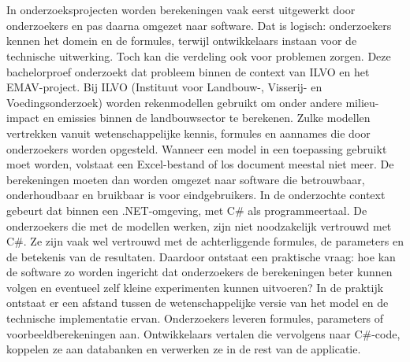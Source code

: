 
\chapter{}%
\label{ch:inleiding}

In onderzoeksprojecten worden berekeningen vaak eerst uitgewerkt door onderzoekers en pas daarna omgezet naar software. Dat is logisch: onderzoekers kennen het domein en de formules, terwijl ontwikkelaars instaan voor de technische uitwerking. Toch kan die verdeling ook voor problemen zorgen. Deze bachelorproef onderzoekt dat probleem binnen de context van ILVO en het EMAV-project.                                                                                   
Bij ILVO (Instituut voor Landbouw-, Visserij- en Voedingsonderzoek) worden rekenmodellen gebruikt om onder andere milieu-impact en emissies binnen de landbouwsector te berekenen. Zulke modellen vertrekken vanuit wetenschappelijke kennis, formules en aannames die door onderzoekers worden opgesteld. Wanneer een model in een toepassing gebruikt moet worden, volstaat een Excel-bestand of los document meestal niet meer.                                                 
De berekeningen moeten dan worden omgezet naar software die betrouwbaar, onderhoudbaar en bruikbaar is voor eindgebruikers. In de onderzochte context gebeurt dat binnen een .NET-omgeving, met C\# als programmeertaal.                                 De onderzoekers die met de modellen werken, zijn niet noodzakelijk vertrouwd met C\#. Ze zijn vaak wel vertrouwd met de achterliggende formules, de parameters en de betekenis van de resultaten. Daardoor ontstaat een praktische vraag: hoe kan de software zo worden ingericht dat onderzoekers de berekeningen beter kunnen volgen en eventueel zelf kleine experimenten kunnen uitvoeren?                                                                                     
In de praktijk ontstaat er een afstand tussen de wetenschappelijke versie van het model en de technische implementatie ervan. Onderzoekers leveren formules, parameters of voorbeeldberekeningen aan. Ontwikkelaars vertalen die vervolgens naar C\#-code, koppelen ze aan databanken en verwerken ze in de rest van de applicatie.                                                                                                                                                
